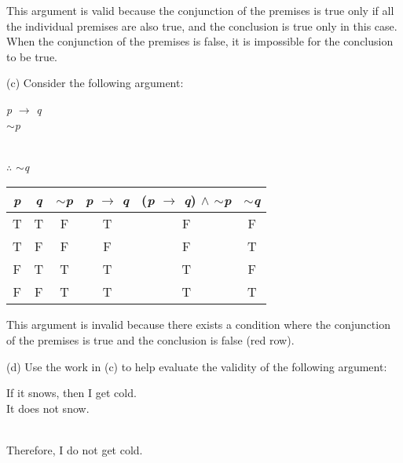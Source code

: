\documentclass{article}
\begin{document}
\begin{itemize}
    {\color{blue} This argument is valid because the conjunction of the premises is true only if all the individual premises are also true, and the conclusion is true only in this case.  When the conjunction of the premises is false, it is impossible for the conclusion to be true.}
    
    (c) Consider the following argument:
    
    \hspace*{1cm} {\color{blue} \emph{p} $\to$ \emph{q}}\\
    \hspace*{1cm} {\color{blue} $\sim$\emph{p}}\\
    \\
    \hspace*{1cm} {\color{blue} $\therefore$ $\sim$\emph{q}}
    
    \begin{center}
        \begin{tabular}{|c|c|c|c|c|c|}
            \hline
            \emph{p} & \emph{q} & $\sim$\emph{p} & \emph{p} $\to$ \emph{q} & (\emph{p} $\to$ \emph{q}) $\wedge$ $\sim$\emph{p} & $\sim$\emph{q}\\
            \hline
            T & T & F & T & F & F\\
            \hline
            T & F & F & F & F & T\\
            \hline
            \rowcolor{LightRed}
            F & T & T & T & T & F\\
            \hline
            \rowcolor{LightCyan}
            F & F & T & T & T & T\\
            \hline
        \end{tabular}
    \end{center}
    
    {\color{blue} This argument is invalid because there exists a condition where the conjunction of the premises is true and the conclusion is false (red row). }
    \newpage
    
    (d) Use the work in (c) to help evaluate the validity of the following argument: 
    
    \hspace*{1cm} If it snows, then I get cold.\\
    \hspace*{1cm} It does not snow.\\
    \\
    \hspace*{1cm} Therefore, I do not get cold.
    

\end{itemize}
\end{document}
